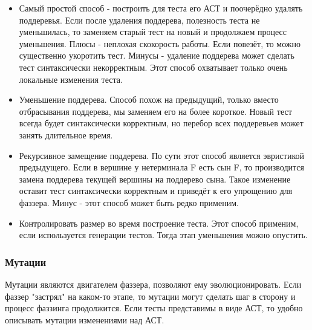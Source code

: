 \documentclass[a4paper]{article}
\begin{document}
\begin{itemize}
\item Самый простой способ - построить для теста его АСТ и поочерёдно удалять поддеревья. Если после удаления поддерева, полезность теста не уменьшилась, то заменяем старый тест на новый и продолжаем процесс уменьшения. Плюсы - неплохая скокорость работы. Если повезёт, то можно существенно укоротить тест. Минусы - удаление поддерева может сделать тест синтаксически некорректным. Этот способ охватывает только очень локальные изменения теста.
\item Уменьшение поддерева. Способ похож на предыдущий, только вместо отбрасывания поддерева, мы заменяем его на более короткое. Новый тест всегда будет синтаксически корректным, но перебор всех поддеревьев может занять длительное время.
\item Рекурсивное замещение поддерева. По сути этот способ является эвристикой предыдущего. Если в вершине у нетерминала F есть сын F, то производится замена поддерева текущей вершины на поддерево сына. Такое изменение оставит тест синтаксически корректным и приведёт к его упрощению для фаззера. Минус - этот способ может быть редко применим.
\item Контролировать размер во время построение теста. Этот способ применим, если используется генерации тестов. Тогда этап уменьшения можно опустить.
\end{itemize}

\subsubsection{Мутации}
\indent

Мутации являются двигателем фаззера, позволяют ему эволюционировать. Если фаззер "застрял" на каком-то этапе, то мутации могут сделать шаг в сторону и процесс фаззинга продолжится. Если тесты представимы в виде АСТ, то удобно описывать мутации изменениями над АСТ. 
\end{document}
